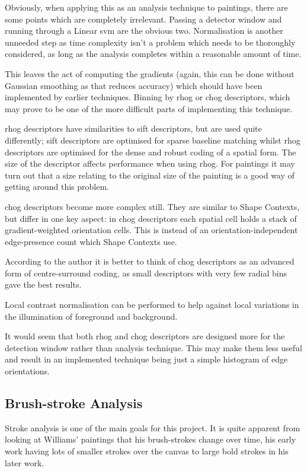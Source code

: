 Obviously, when applying this as an analysis technique to paintings, there are some points which
are completely irrelevant. Passing a detector window and running through a Linear \gls{svm} are
the obvious two. Normalisation is another unneeded step as time complexity isn't a problem which
needs to be thoroughly considered, as long as the analysis completes within a reasonable amount of
time.

This leaves the act of computing the gradients (again, this can be done without Gaussian smoothing
as that reduces accuracy) which should have been implemented by earlier techniques. Binning 
by \gls{rhog} or \gls{chog} descriptors, which may prove to be one of the more difficult parts of
implementing this technique.

\Gls{rhog} descriptors have similarities to \gls{sift} descriptors, but are used quite 
differently; \gls{sift} descriptors are optimised for sparse baseline matching whilst \gls{rhog}
descriptors are optimised for the dense and robust coding of a spatial form. The size of the
descriptor affects performance when using \gls{rhog}. For paintings it may turn out that a size
relating to the original size of the painting is a good way of getting around this problem.

\Gls{chog} descriptors become more complex still. They are similar to Shape 
Contexts\cite{ Belongie2001Matching}, but differ in one key aspect: in \gls{chog} descriptors each
spatial cell holds a stack of gradient-weighted orientation cells. This is instead of an orientation-independent
edge-presence count which Shape Contexts use.

According to the author it is better to think of \gls{chog} descriptors as an advanced form of 
centre-surround coding, as small descriptors with very few radial bins gave the best results.

Local contrast normalisation can be performed to help against local variations in the illumination
of foreground and background.

It would seem that both \gls{rhog} and \gls{chog} descriptors are designed more for the detection
window rather than analysis technique. This may make them less useful and result in an implemented
technique being just a simple histogram of edge orientations.

\subsection{Brush-stroke Analysis}\label{sec:existing-brush-stroke}
Stroke analysis is one of the main goals for this project. It is quite apparent from looking at 
Williams' paintings that his brush-strokes change over time, his early work having lots of
smaller strokes over the canvas to large bold strokes in his later work.

